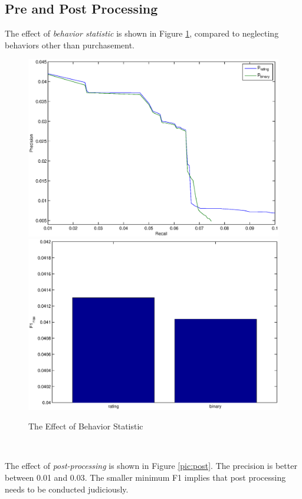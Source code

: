 \documentclass[11pt,a4paper,titlepage]{article}
\begin{document}
\subsection{Pre and Post Processing}

The effect of \emph{behavior statistic} is shown in Figure \ref{pic:pre}, compared to neglecting behaviors other than purchasement.

\begin{figure}[!h]
\includegraphics[width=\linewidth]{./rating.eps}
\includegraphics[width=\linewidth]{./rating_f1.eps}
\caption{The Effect of Behavior Statistic}
\label{pic:pre}
\end{figure}

~

The effect of \emph{post-processing} is shown in Figure \ref{pic:post}. The precision is better between 0.01 and 0.03. The smaller minimum F1 implies that post processing needs to be conducted judiciously.
\end{document}
